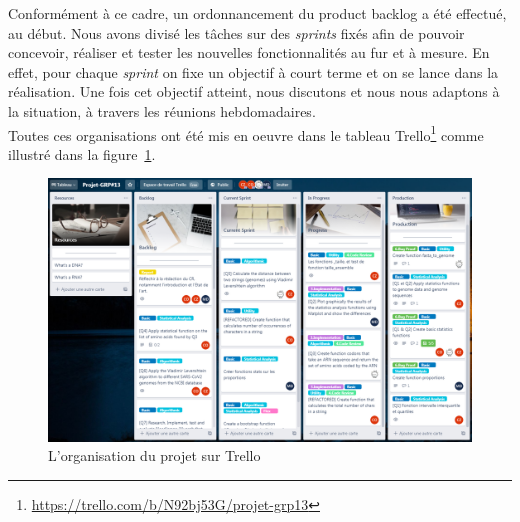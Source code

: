 \documentclass[12pt]{article}
\begin{document}
Conformément à ce cadre, un ordonnancement du product backlog a été effectué, au début. Nous avons divisé les tâches sur des \textsl{sprints} fixés afin de pouvoir concevoir, réaliser et tester les nouvelles fonctionnalités au fur et à mesure.
En effet, pour chaque \textsl{sprint} on fixe un objectif à court terme et on se lance dans la réalisation. Une fois cet objectif atteint, nous discutons et nous nous adaptons à la situation, à travers les réunions hebdomadaires. \\
Toutes ces organisations ont été mis en oeuvre dans le tableau Trello\footnote{\url{https://trello.com/b/N92bj53G/projet-grp13}} comme illustré dans la figure~\ref{fig:Trellomid}.
    \begin{figure}[!h]
        \centering
        \includegraphics[scale = 0.5]{Images/Gestion de Projet/Trello/trello_milieu.PNG}
        \caption{L'organisation du projet sur Trello}
        \label{fig:Trellomid}
    \end{figure}
\end{document}
